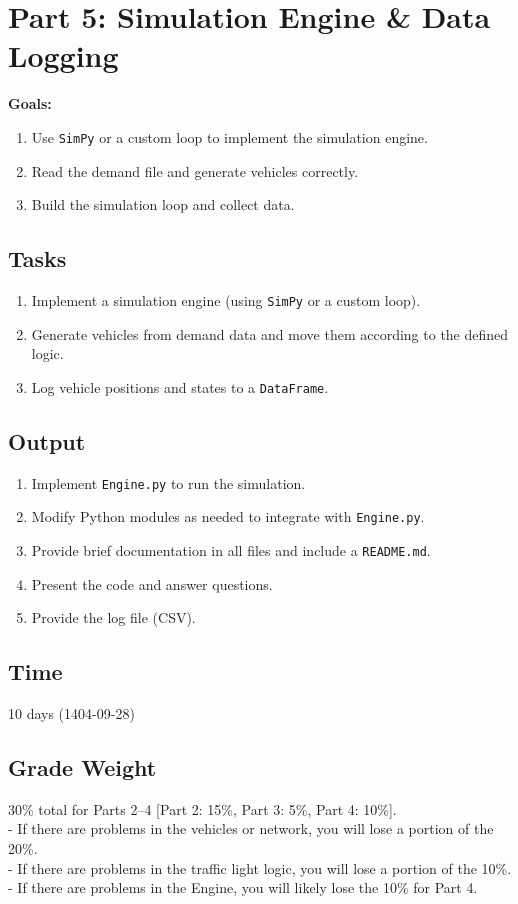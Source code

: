 \documentclass{KPS_assignment}
\begin{document}
\maketitle
\section*{Part 5: Simulation Engine \& Data Logging}

\textbf{Goals:}
\begin{enumerate}
\item Use \texttt{SimPy} or a custom loop to implement the simulation engine.
\item Read the demand file and generate vehicles correctly.
\item Build the simulation loop and collect data.
\end{enumerate}

\subsection*{Tasks}
\begin{enumerate}
    \item Implement a simulation engine (using \texttt{SimPy} or a custom loop).
    \item Generate vehicles from demand data and move them according to the defined logic.
    \item Log vehicle positions and states to a \texttt{DataFrame}.
\end{enumerate}

\subsection*{Output}
\begin{enumerate}
\item Implement \texttt{Engine.py} to run the simulation.
\item Modify Python modules as needed to integrate with \texttt{Engine.py}.
\item Provide brief documentation in all files and include a \texttt{README.md}.
\item Present the code and answer questions.
\item Provide the log file (CSV).
\end{enumerate}

\subsection*{Time}
10 days (1404-09-28)

\subsection*{Grade Weight}
30\% total for Parts 2--4 [Part 2: 15\%, Part 3: 5\%, Part 4: 10\%].\\
- If there are problems in the vehicles or network, you will lose a portion of the 20\%.\\
- If there are problems in the traffic light logic, you will lose a portion of the 10\%.\\
- If there are problems in the Engine, you will likely lose the 10\% for Part 4.
\end{document}
